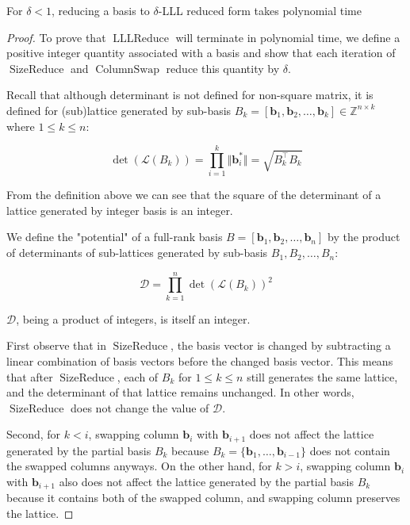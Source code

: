 \begin{theorem}
    For $\delta < 1$, reducing a basis to $\delta$-LLL reduced form takes polynomial time
\end{theorem}
\begin{proof}
    To prove that $\operatorname{LLLReduce}$ will terminate in polynomial time, we define a positive integer quantity associated with a basis and show that each iteration of $\operatorname{SizeReduce}$ and $\operatorname{ColumnSwap}$ reduce this quantity by $\delta$.

    Recall that although determinant is not defined for non-square matrix, it is defined for (sub)lattice generated by sub-basis $B_k = [\mathbf{b}_1, \mathbf{b}_2, \ldots, \mathbf{b}_k] \in \mathbb{Z}^{n \times k}$ where $1 \leq k \leq n$:

    $$
    \det(\mathcal{L}(B_k)) = \prod_{i=1}^k \Vert \mathbf{b}_i^\ast \Vert = \sqrt{B_k^\intercal B_k}
    $$

    From the definition above we can see that the square of the determinant of a lattice generated by integer basis is an integer. 

    We define the "potential" of a full-rank basis $B = [\mathbf{b}_1, \mathbf{b}_2, \ldots, \mathbf{b}_n]$ by the product of determinants of sub-lattices generated by sub-basis $B_1, B_2, \ldots, B_n$:

    $$
    \mathcal{D} = \prod_{k=1}^n \det(\mathcal{L}(B_k))^2
    $$

    $\mathcal{D}$, being a product of integers, is itself an integer.

    First observe that in $\operatorname{SizeReduce}$, the basis vector is changed by subtracting a linear combination of basis vectors before the changed basis vector. This means that after $\operatorname{SizeReduce}$, each of $B_k$ for $1\leq k \leq n$ still generates the same lattice, and the determinant of that lattice remains unchanged. In other words, $\operatorname{SizeReduce}$ does not change the value of $\mathcal{D}$.

    Second, for $k < i$, swapping column $\mathbf{b}_i$ with $\mathbf{b}_{i+1}$ does not affect the lattice generated by the partial basis $B_k$ because $B_k = \{\mathbf{b}_1, \ldots, \mathbf{b}_{i-1}\}$ does not contain the swapped columns anyways. On the other hand, for $k > i$, swapping column $\mathbf{b}_i$ with $\mathbf{b}_{i+1}$ also does not affect the lattice generated by the partial basis $B_k$ because it contains both of the swapped column, and swapping column preserves the lattice.


\end{proof}
